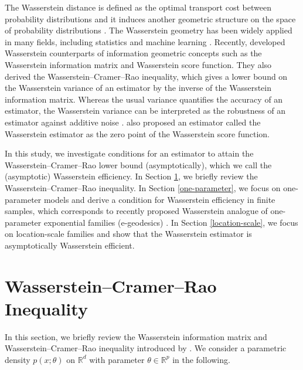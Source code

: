 \documentclass[11pt, a4paper]{article}
\begin{document}
The Wasserstein distance is defined as the optimal transport cost between probability distributions and it induces another geometric structure on the space of probability distributions \citep{villani2}. 
The Wasserstein geometry has been widely applied in many fields, including statistics and machine learning \citep{Chewi,PC2019,Santambrogio}. 
Recently, \citet{WIM} developed Wasserstein counterparts of information geometric concepts such as the Wasserstein information matrix and Wasserstein score function.
They also derived the Wasserstein--Cramer--Rao inequality, which gives a lower bound on the Wasserstein variance of an estimator by the inverse of the Wasserstein information matrix. 
Whereas the usual variance quantifies the accuracy of an estimator, the Wasserstein variance can be interpreted as the robustness of an estimator against additive noise \citep{affine}.
\citet{WIM} also proposed an estimator called the Wasserstein estimator as the zero point of the Wasserstein score function.





In this study, we investigate conditions for an estimator to attain the Wasserstein--Cramer--Rao lower bound (asymptotically), which we call the (asymptotic) Wasserstein efficiency. 
In Section \ref{review}, we briefly review the Wasserstein--Cramer--Rao inequality. 
In Section \ref{one-parameter}, we focus on one-parameter models and derive a condition for Wasserstein efficiency in finite samples, which corresponds to recently proposed Wasserstein analogue of one-parameter exponential families (e-geodesics) \cite{ay2024information}. 
In Section \ref{location-scale}, we focus on location-scale families and show that the Wasserstein estimator is asymptotically Wasserstein efficient.








\section{Wasserstein--Cramer--Rao Inequality}\label{review}
In this section, we briefly review the Wasserstein information matrix and Wasserstein--Cramer--Rao inequality introduced by \citet{WIM}. 
We consider a parametric density $p(x;\theta)$ on $\mathbb{R}^d$ with parameter $\theta \in \mathbb{R}^p$ in the following.
\end{document}
